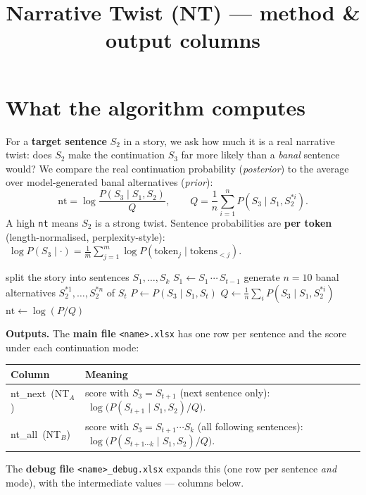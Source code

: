 \documentclass[11pt]{article}
\title{\vspace{-1.5cm}\textbf{Narrative Twist (NT) --- method \& output columns}}
\date{}
\newcommand{\col}[1]{\texttt{#1}}
\begin{document}
\maketitle
\vspace{-1.1cm}

\section*{What the algorithm computes}
For a \textbf{target sentence} $S_2$ in a story, we ask how much it is a real
narrative twist: does $S_2$ make the continuation $S_3$ far more likely than a
\emph{banal} sentence would? We compare the real continuation probability
(\emph{posterior}) to the average over model-generated banal alternatives
(\emph{prior}):
\[
\mathrm{nt}=\log\frac{P(S_3\mid S_1,S_2)}{Q},
\qquad
Q=\frac{1}{n}\sum_{i=1}^{n}P\!\left(S_3\mid S_1,S_2^{*i}\right).
\]
A high \col{nt} means $S_2$ is a strong twist. Sentence probabilities are
\textbf{per token} (length-normalised, perplexity-style):
$\;\log P(S_3\mid\cdot)=\frac1m\sum_{j=1}^{m}\log P(\text{token}_j\mid \text{tokens}_{<j})$.

\begin{algorithm}[h]
\begin{algorithmic}[1]
\State split the story into sentences $S_1,\dots,S_k$
 
  \State $S_1 \gets S_1\,\cdots\,S_{t-1}$ 
  \State generate $n{=}10$ banal alternatives $S_2^{*1},\dots,S_2^{*n}$ of $S_t$ 
    \State $P \gets P(S_3\mid S_1,S_t)$ 
    \State $Q \gets \frac1n\sum_i P(S_3\mid S_1,S_2^{*i})$ 
    \State $\mathrm{nt} \gets \log(P/Q)$ 
  \EndFor
\EndFor
\end{algorithmic}
\end{algorithm}

\textbf{Outputs.} The \textbf{main file} \col{<name>.xlsx} has one row per
sentence and the score under each continuation mode:
\begin{center}
\begin{tabular}{@{}>{\ttfamily}l l@{}}
\toprule
\normalfont\textbf{Column} & \textbf{Meaning} \\
\midrule
nt\_next\ \textnormal{(NT$_A$)} & score with $S_3=S_{t+1}$ (next sentence only): $\ \log\!\big(P(S_{t+1}\mid S_1,S_2)/Q\big)$. \\
nt\_all\ \textnormal{(NT$_B$)}  & score with $S_3=S_{t+1}\cdots S_k$ (all following sentences): $\ \log\!\big(P(S_{t+1\cdots k}\mid S_1,S_2)/Q\big)$. \\
\bottomrule
\end{tabular}
\end{center}
The \textbf{debug file} \col{<name>\_debug.xlsx} expands this (one row per
sentence \emph{and} mode), with the intermediate values --- columns below.
\end{document}
